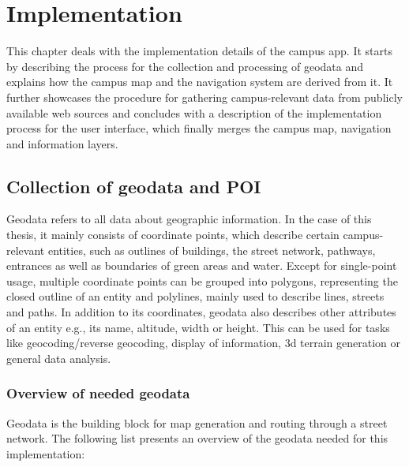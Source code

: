\chapter{Implementation}
This chapter deals with the implementation details of the campus app. It starts by describing the process for the collection and processing of geodata and explains how the campus map and the navigation system are derived from it. It further showcases the procedure for gathering campus-relevant data from publicly available web sources and concludes with a description of the implementation process for the user interface, which finally merges the campus map, navigation and information layers.

\label{cha:implementation}
\section{Collection of geodata and POI}
Geodata refers to all data about geographic information. In the case of this thesis, it mainly consists of coordinate points, which describe certain campus-relevant entities, such as outlines of buildings, the street network, pathways, entrances as well as boundaries of green areas and water. Except for single-point usage, multiple coordinate points can be grouped into polygons, representing the closed outline of an entity and polylines, mainly used to describe lines, streets and paths. In addition to its coordinates, geodata also describes other attributes of an entity e.g., its name, altitude, width or height. This can be used for tasks like geocoding/reverse geocoding, display of information, 3d terrain generation or general data analysis.

\subsection{Overview of needed geodata}
Geodata is the building block for map generation and routing through a street network. The following list presents an overview of the geodata needed for this implementation:

